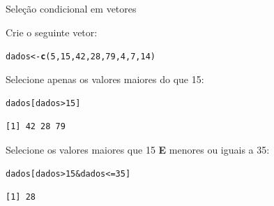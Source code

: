 \documentclass[10pt,handout]{beamer}\usepackage[]{graphicx}\usepackage[]{color}
\makeatletter
\newcommand{\hlnum}[1]{\textcolor[rgb]{0.686,0.059,0.569}{#1}}%
\newcommand{\hlopt}[1]{\textcolor[rgb]{0,0,0}{#1}}%
\newcommand{\hlstd}[1]{\textcolor[rgb]{0.345,0.345,0.345}{#1}}%
\newcommand{\hlkwb}[1]{\textcolor[rgb]{0.69,0.353,0.396}{#1}}%
\newcommand{\hlkwd}[1]{\textcolor[rgb]{0.737,0.353,0.396}{\textbf{#1}}}%
\newenvironment{kframe}{%
 \def\at@end@of@kframe{}%
 \ifinner\ifhmode%
  \def\at@end@of@kframe{\end{minipage}}%
  \begin{minipage}{\columnwidth}%
 \fi\fi%
 \def\FrameCommand##1{\hskip\@totalleftmargin \hskip-\fboxsep
 \colorbox{shadecolor}{##1}\hskip-\fboxsep
     \hskip-\linewidth \hskip-\@totalleftmargin \hskip\columnwidth}%
 \MakeFramed {\advance\hsize-\width
   \@totalleftmargin\z@ \linewidth\hsize
   \@setminipage}}%
 {\par\unskip\endMakeFramed%
 \at@end@of@kframe}
\newenvironment{knitrout}{}{} %
\makeatother
\begin{document}
\begin{frame}[fragile]{Seleção condicional em vetores}
\begin{center}
\end{center}
Crie o seguinte vetor:
\begin{knitrout}\small
{}\color{fgcolor}\begin{kframe}
\begin{alltt}
\hlstd{dados} \hlkwb{<-} \hlkwd{c}\hlstd{(}\hlnum{5}\hlstd{,} \hlnum{15}\hlstd{,} \hlnum{42}\hlstd{,} \hlnum{28}\hlstd{,} \hlnum{79}\hlstd{,} \hlnum{4}\hlstd{,} \hlnum{7}\hlstd{,} \hlnum{14}\hlstd{)}
\end{alltt}
\end{kframe}
\end{knitrout}
Selecione apenas os valores maiores do que 15:
\begin{knitrout}\small
{}\color{fgcolor}\begin{kframe}
\begin{alltt}
\hlstd{dados[dados} \hlopt{>} \hlnum{15}\hlstd{]}
\end{alltt}
\begin{verbatim}
[1] 42 28 79
\end{verbatim}
\end{kframe}
\end{knitrout}
Selecione os valores maiores que 15 \textbf{E} menores ou iguais a 35:
\begin{knitrout}\small
{}\color{fgcolor}\begin{kframe}
\begin{alltt}
\hlstd{dados[dados} \hlopt{>} \hlnum{15} \hlopt{&} \hlstd{dados} \hlopt{<=} \hlnum{35}\hlstd{]}
\end{alltt}
\begin{verbatim}
[1] 28
\end{verbatim}
\end{kframe}
\end{knitrout}
\end{frame}
\end{document}
